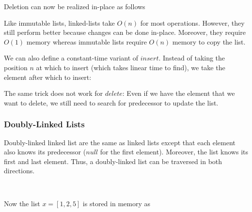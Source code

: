Deletion can now be realized in-place as follows
\begin{acode}
\end{acode}

Like immutable lists, linked-lists take $O(n)$ for most operations.
However, they still perform better because changes can be done in-place.
Moreover, they require $O(1)$ memory whereas immutable lists require $O(n)$ memory to copy the list.

We can also define a constant-time variant of $insert$.
Instead of taking the position $n$ at which to insert (which takes linear time to find), we take the element after which to insert:
\begin{acode}
\end{acode}

The same trick does not work for $delete$: Even if we have the element that we want to delete, we still need to search for predecessor to update the list.

\subsubsection{Doubly-Linked Lists}

Doubly-linked linked list are the same as linked lists except that each element also knows its predecessor ($null$ for the first element).
Moreover, the list knows its first and last element.
Thus, a doubly-linked list can be traversed in both directions.

\begin{acode}
\\
\end{acode}

Now the list $x=[1,2,5]$ is stored in memory as
\begin{amemory}
\alocations
{}
\hline
{}
\hline
{}
\hline
{}
\end{amemory}

